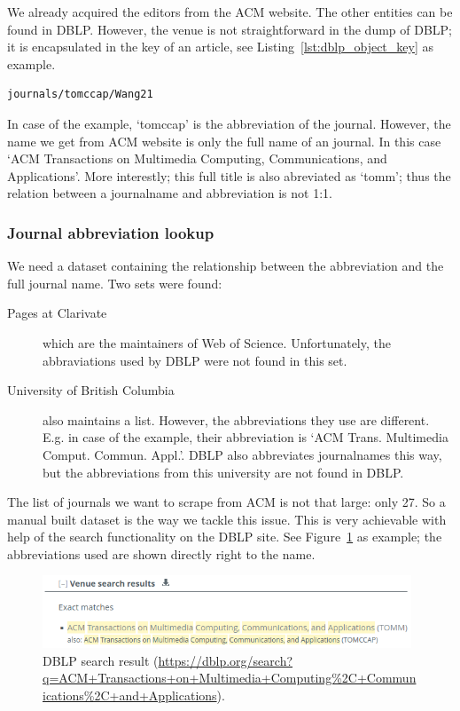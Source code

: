 \documentclass{ou-report}
\begin{document}
We already acquired the editors from the ACM website. The other entities can be 
found in DBLP. 
However, the venue is not straightforward in the dump of DBLP; it is 
encapsulated in the key of an article, see Listing~\ref{lst:dblp_object_key} 
as example.

\lstset{language=XML}
\begin{lstlisting}[caption={Example DBLP key},label={lst:dblp_object_key}]
journals/tomccap/Wang21
\end{lstlisting}

In case of the example, `tomccap' is the abbreviation of the journal. However, 
the name we get from ACM website is only the full name of an journal. In this
case `ACM Transactions on Multimedia Computing, Communications, and
Applications'.
More interestly; this full title is also abreviated as `tomm'; thus the relation
between a journalname and abbreviation is not 1:1.

\subsubsection{Journal abbreviation lookup}
We need a dataset containing the relationship between the abbreviation and the
full journal name. Two sets were found:
\begin{description}
    \item[Pages at Clarivate] which are the maintainers of Web of Science. 
    Unfortunately, the abbraviations used by DBLP were not found in this set.
    \item[University of British Columbia] also maintains a list. However, the 
    abbreviations they use are different. E.g. in case of the example, their
    abbreviation is `ACM Trans. Multimedia Comput. Commun. Appl.'. DBLP
    also abbreviates journalnames this way, but the 
    abbreviations from this university are not found in DBLP.
\end{description}
The list of journals we want to scrape from ACM is not that large: only 27. So
a manual built dataset is the way we tackle this issue. This is very achievable 
with help of the search functionality on the DBLP site. See 
Figure~\ref{fig:dblp_search_result} as example; the abbreviations used are shown
directly right to the name.
\begin{figure}[H]
\centering
\includegraphics[width=11cm]{images/dblp_search_result.png}
\caption{DBLP search result (\url{https://dblp.org/search?q=ACM+Transactions+on+Multimedia+Computing\%2C+Communications\%2C+and+Applications}).}
\label{fig:dblp_search_result}
\end{figure}
\end{document}
